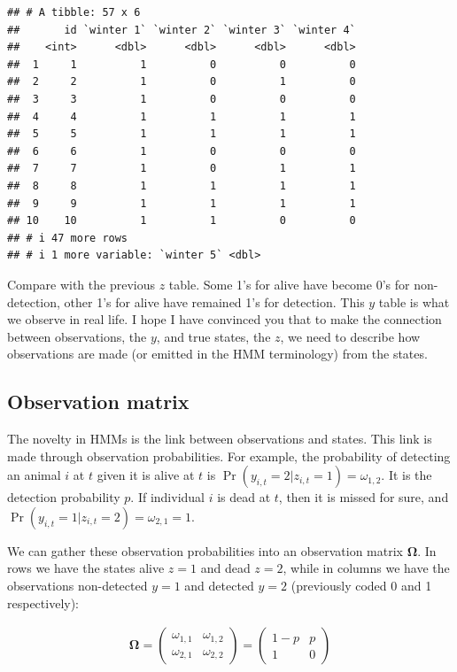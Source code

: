 \documentclass[
  12pt,
]{krantz}
\begin{document}
\begin{verbatim}
## # A tibble: 57 x 6
##       id `winter 1` `winter 2` `winter 3` `winter 4`
##    <int>      <dbl>      <dbl>      <dbl>      <dbl>
##  1     1          1          0          0          0
##  2     2          1          0          1          0
##  3     3          1          0          0          0
##  4     4          1          1          1          1
##  5     5          1          1          1          1
##  6     6          1          0          0          0
##  7     7          1          0          1          1
##  8     8          1          1          1          1
##  9     9          1          1          1          1
## 10    10          1          1          0          0
## # i 47 more rows
## # i 1 more variable: `winter 5` <dbl>
\end{verbatim}

Compare with the previous \(z\) table. Some 1's for alive have become 0's for non-detection, other 1's for alive have remained 1's for detection. This \(y\) table is what we observe in real life. I hope I have convinced you that to make the connection between observations, the \(y\), and true states, the \(z\), we need to describe how observations are made (or emitted in the HMM terminology) from the states.

\subsection{Observation matrix}\label{observation-matrix}

The novelty in HMMs is the link between observations and states. This link is made through observation probabilities. For example, the probability of detecting an animal \(i\) at \(t\) given it is alive at \(t\) is \(\Pr(y_{i,t}=2|z_{i,t}=1)=\omega_{1,2}\). It is the detection probability \(p\). If individual \(i\) is dead at \(t\), then it is missed for sure, and \(\Pr(y_{i,t}=1|z_{i,t}=2)=\omega_{2,1}=1\).

We can gather these observation probabilities into an observation matrix \(\mathbf{\Omega}\). In rows we have the states alive \(z = 1\) and dead \(z = 2\), while in columns we have the observations non-detected \(y = 1\) and detected \(y = 2\) (previously coded 0 and 1 respectively):

\begin{align*}
\mathbf{\Omega} =
\left(\begin{array}{cc}
\omega_{1,1} & \omega_{1,2}\\
\omega_{2,1} & \omega_{2,2}
\end{array}\right) =
\left(\begin{array}{cc}
1 - p & p\\
1 & 0
\end{array}\right)
\end{align*}
\end{document}
